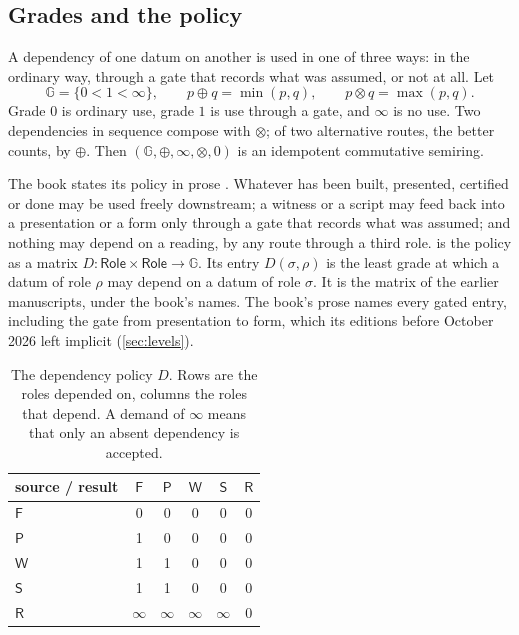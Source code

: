 \documentclass[11pt]{article}
\numberwithin{equation}{section}
\theoremstyle{definition}
\theoremstyle{plain}
\theoremstyle{remark}
\newcommand{\Role}{\mathsf{Role}}
\newcommand{\Frm}{\mathsf F}
\newcommand{\Prs}{\mathsf P}
\newcommand{\Wit}{\mathsf W}
\newcommand{\Scr}{\mathsf S}
\newcommand{\Ren}{\mathsf R}
\newcommand{\Gd}{\mathbb G}
\newcommand{\absent}{\boldsymbol\infty}
\begin{document}
\subsection{Grades and the policy}\label{sec:policy}

A dependency of one datum on another is used in one of three ways: in the
ordinary way, through a gate that records what was assumed, or not at all.
Let
\[
  \Gd=\{0<1<\absent\},
  \qquad
  p\oplus q=\min(p,q),
  \qquad
  p\otimes q=\max(p,q).
\]
Grade \(0\) is ordinary use, grade \(1\) is use through a gate, and
\(\absent\) is no use.  Two dependencies in sequence compose with \(\otimes\);
of two alternative routes, the better counts, by \(\oplus\).  Then
\((\Gd,\oplus,\absent,\otimes,0)\) is an idempotent commutative semiring.

The book states its policy in prose \cite[\S1.9]{Book}.  Whatever has been
built, presented, certified or done may be used freely downstream; a witness
or a script may feed back into a presentation or a form only through a gate
that records what was assumed; and nothing may depend on a reading, by any
route through a third role.   is the policy as a matrix
\(D:\Role\times\Role\to\Gd\).  Its entry \(D(\sigma,\rho)\) is the least
grade at which a datum of role \(\rho\) may depend on a datum of role
\(\sigma\).  It is the matrix of the earlier manuscripts, under the book's
names.  The book's prose names every gated entry, including the gate from
presentation to form, which its editions before October 2026 left implicit
(\cref{sec:levels}).

\begin{table}[ht]
\centering
\small
\begin{tabular}{@{}lccccc@{}}
\toprule
source / result & \(\Frm\) & \(\Prs\) & \(\Wit\) & \(\Scr\) & \(\Ren\)\\
\midrule
\(\Frm\) & 0 & 0 & 0 & 0 & 0\\
\(\Prs\) & 1 & 0 & 0 & 0 & 0\\
\(\Wit\) & 1 & 1 & 0 & 0 & 0\\
\(\Scr\) & 1 & 1 & 0 & 0 & 0\\
\(\Ren\) & \(\absent\) & \(\absent\) & \(\absent\) & \(\absent\) & 0\\
\bottomrule
\end{tabular}
\caption{The dependency policy \(D\).  Rows are the roles depended on,
columns the roles that depend.  A demand of \(\absent\) means that only an
absent dependency is accepted.}
\label{tab:policy}
\end{table}
\end{document}

